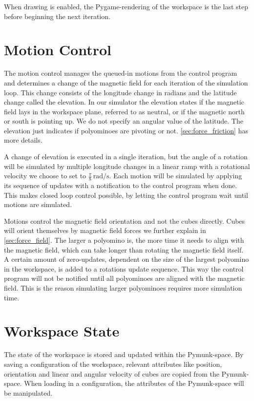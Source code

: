 When drawing is enabled, the Pygame-rendering of the workspace is the last step before beginning the next iteration.


\section{Motion Control}
\label{sec:motion_control}

The motion control manages the queued-in motions from the control program and determines a change of the magnetic field for each iteration of the simulation loop.
This change consists of the longitude change in radians and the latitude change called the elevation.
In our simulator the elevation states if the magnetic field lays in the workspace plane, referred to as neutral, or if the magnetic north or south is pointing up.
We do not specify an angular value of the latitude.
The elevation just indicates if polyominoes are pivoting or not.
\autoref{sec:force_friction} has more details.

A change of elevation is executed in a single iteration, but the angle of a rotation will be simulated by multiple longitude changes in a linear ramp with a rotational velocity we choose to set to $\frac{\pi}{8} \, \text{rad}/\text{s}$.
Each motion will be simulated by applying its sequence of updates with a notification to the control program when done.
This makes closed loop control possible, by letting the control program wait until motions are simulated.

Motions control the magnetic field orientation and not the cubes directly.
Cubes will orient themselves by magnetic field forces we further explain in \autoref{sec:force_field}.
The larger a polyomino is, the more time it needs to align with the magnetic field, which can take longer than rotating the magnetic field itself.
A certain amount of zero-updates, dependent on the size of the largest polyomino in the workspace, is added to a rotations update sequence.
This way the control program will not be notified until all polyominoes are aligned with the magnetic field.
This is the reason simulating larger polyominoes requires more simulation time.


\section{Workspace State}
\label{sec:workspace_state}

The state of the workspace is stored and updated within the Pymunk-space.
By saving a configuration of the workspace, relevant attributes like position, orientation and linear and angular velocity of cubes are copied from the Pymunk-space.
When loading in a configuration, the attributes of the Pymunk-space will be manipulated.


